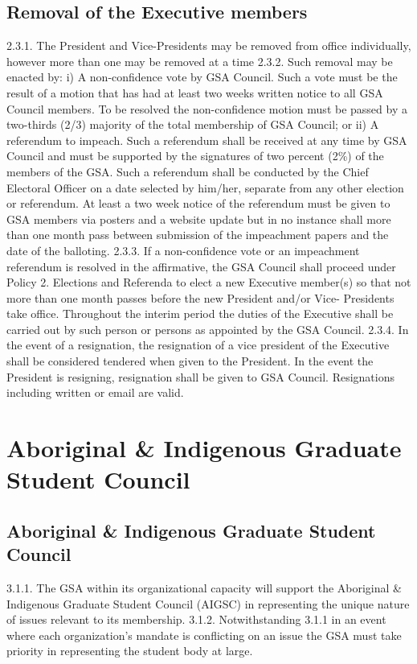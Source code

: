 \documentclass{article}
\begin{document}
\subsection{Removal of the Executive members }
2.3.1. The President and Vice-Presidents may be removed from office 
individually, however more than one may be removed at a time 
2.3.2. Such removal may be enacted by: 
i) A non-confidence vote by GSA Council. Such a vote must be the 
result of a motion that has had at least two weeks written notice to all GSA Council members. To be resolved the non-confidence motion 
must be passed by a two-thirds (2/3) majority of the total membership 
of GSA Council; or 
ii) A referendum to impeach. Such a referendum shall be received at any 
time by GSA Council and must be supported by the signatures of two 
percent (2\%) of the members of the GSA. Such a referendum shall be 
conducted by the Chief Electoral Officer on a date selected by him/her, 
separate from any other election or referendum. At least a two week 
notice of the referendum must be given to GSA members via posters 
and a website update but in no instance shall more than one month 
pass between submission of the impeachment papers and the date of 
the balloting. 
2.3.3. If a non-confidence vote or an impeachment referendum is resolved in 
the affirmative, the GSA Council shall proceed under Policy 2. 
Elections and Referenda to elect a new Executive member(s) so that 
not more than one month passes before the new President and/or Vice- 
Presidents take office. Throughout the interim period the duties of the 
Executive shall be carried out by such person or persons as appointed 
by the GSA Council. 
2.3.4. In the event of a resignation, the resignation of a vice president of the 
Executive shall be considered tendered when given to the President. In 
the event the President is resigning, resignation shall be given to GSA 
Council. Resignations including written or email are valid. 
\section{ Aboriginal \& Indigenous Graduate Student Council }
\subsection{Aboriginal \& Indigenous Graduate Student Council }
3.1.1. The GSA within its organizational capacity will support the Aboriginal 
\& Indigenous Graduate Student Council (AIGSC) in representing the 
unique nature of issues relevant to its membership. 
3.1.2. Notwithstanding 3.1.1 in an event where each organization’s mandate 
is conflicting on an issue the GSA must take priority in representing 
the student body at large. 
\end{document}
